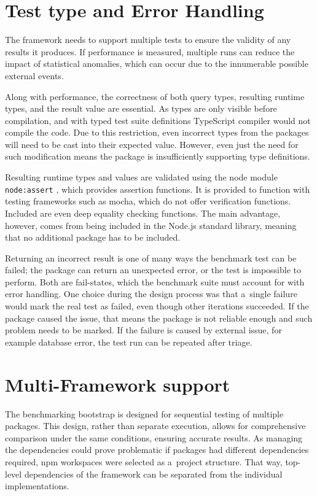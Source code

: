 \section{Test type and Error Handling}

The framework needs to support multiple tests to ensure the validity of any
results it produces. If performance is measured, multiple runs can reduce the
impact of statistical anomalies, which can occur due to the innumerable possible
external events.

Along with performance, the correctness of both query types, resulting runtime
types, and the result value are essential. As types are only visible before
compilation, and with typed test suite definitions TypeScript compiler would not
compile the code. Due to this restriction, even incorrect types from the
packages will need to be cast into their expected value. However, even just the
need for such modification means the package is insufficiently supporting type
definitions.

Resulting runtime types and values are validated using the node module
\texttt{node:assert} \cite{NodeAssert}, which provides assertion functions. It
is provided to function with testing frameworks such as mocha, which do not
offer verification functions. Included are even deep equality checking
functions. The main advantage, however, comes from being included in the Node.js
standard library, meaning that no additional package has to be included.

Returning an incorrect result is one of many ways the benchmark test can be
failed; the package can return an unexpected error, or the test is impossible to
perform. Both are fail-states, which the benchmark suite must account for with
error handling. One choice during the design process was that a~single failure
would mark the real test as failed, even though other iterations succeeded. If
the package caused the issue, that means the package is not reliable enough and
such problem needs to be marked. If the failure is caused by external issue, for
example database error, the test run can be repeated after triage.

\section{Multi-Framework support}

The benchmarking bootstrap is designed for sequential testing of multiple
packages. This design, rather than separate execution, allows for comprehensive
comparison under the same conditions, ensuring accurate results. As managing the
dependencies could prove problematic if packages had different dependencies
required, npm workspaces \cite{npmWorkspaces} were selected as a~project
structure. That way, top-level dependencies of the framework can be separated
from the individual implementations.

